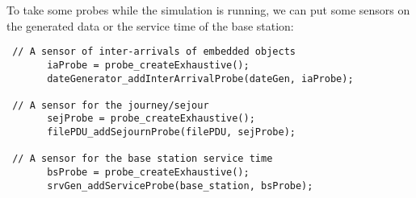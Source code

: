   To take some probes while the simulation is running, we can put some sensors on the generated data or the service time of the base station:

\begin{verbatim}
 // A sensor of inter-arrivals of embedded objects
       iaProbe = probe_createExhaustive();
       dateGenerator_addInterArrivalProbe(dateGen, iaProbe);

 // A sensor for the journey/sejour
       sejProbe = probe_createExhaustive();
       filePDU_addSejournProbe(filePDU, sejProbe);

 // A sensor for the base station service time
       bsProbe = probe_createExhaustive();
       srvGen_addServiceProbe(base_station, bsProbe);
\end{verbatim}
